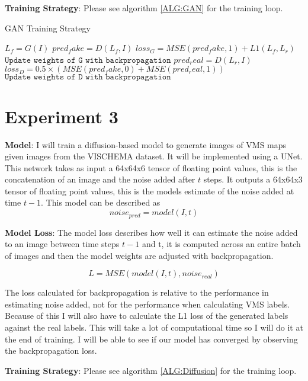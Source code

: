 \documentclass{UoYCSproject}
\begin{document}
\textbf{Training Strategy}: Please see algorithm \ref{ALG:GAN} for the training loop.

\begin{algorithm}
\caption{GAN Training Strategy}\label{ALG:GAN}
\begin{algorithmic}[1]
\State
\State $L_{f} = G(I)$
\State
\State $pred_fake = D(L_{f}, I) $
\State $loss_G = MSE( pred_fake, 1 ) + L1(L_{f}, L_{r}) $
\State $\texttt{Update weights of G with backpropagation}$
\State
\State $pred_real = D(L_{r}, I)$
\State $loss_D = 0.5 \times  ( MSE( pred_fake, 0) + MSE( pred_real, 1) ) $
\State $\texttt{Update weights of D with backpropagation}$
\State
\EndFor
\EndFor
\end{algorithmic}
\end{algorithm}

\section{Experiment 3}
%
\textbf{Model}: I will train a diffusion-based model to generate images of VMS maps given images from the VISCHEMA dataset. It will be implemented using a UNet. This network takes as input a 64x64x6 tensor of floating point values, this is the concatenation of an image and the noise added after $t$ steps.
It outputs a 64x64x3 tensor of floating point values, this is the models estimate of the noise added at time $t-1$.
This model can be described as \[ noise_{pred} = model(I, t) \]

\textbf{Model Loss}: The model loss describes how well it can estimate the noise added to an image between time steps $t-1$ and t, it is computed across an entire batch of images and then the model weights are adjusted with backpropagation.

\[ L = MSE( model(I, t), noise_{real} ) \]

The loss calculated for backpropagation is relative to the performance in estimating noise added, not for the performance when calculating VMS labels. Because of this I will also have to calculate the L1 loss of the generated labels against the real labels. This will take a lot of computational time so I will do it at the end of training. I will be able to see if our model has converged by observing the backpropagation loss. 

\textbf{Training Strategy}: Please see algorithm \ref{ALG:Diffusion} for the training loop.
\end{document}
